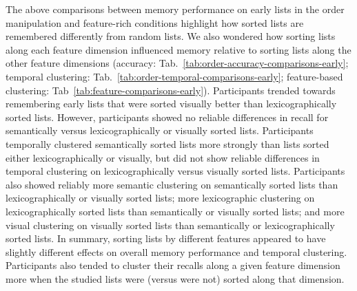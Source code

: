 \documentclass[11pt]{article}
\newcommand{\abbreviations}{S1}
\begin{document}
\begin{table}[tp]
\centering
\tiny

    
\caption{\textbf{Comparing temporal clustering on early lists in different
order manipulation conditions.} The independent samples $t$-tests reported in
the table were carried out across-participants, and reflect data aggregated
across all early lists from each participant. Abbreviations used in this table
are defined in Table~\abbreviations.}

\label{tab:order-temporal-comparisons-early}
\end{table}

\begin{table}[tp]
\centering
\tiny

    
\caption{\textbf{Comparing feature-based clustering on early lists in different
order manipulation conditions.} The independent samples $t$-tests reported in
the table were carried out across-participants, and reflect data aggregated
across all early lists from each participant. The feature used to compute
clustering is shown before the colon in each row, and the conditions being
compared are shown after the colon. Abbreviations used in this table are
defined in Table~\abbreviations.}

\label{tab:feature-comparisons-early}
\end{table}



The above comparisons between memory performance on early lists in the order
manipulation and feature-rich conditions highlight how sorted lists are
remembered differently from random lists. We also wondered how sorting lists
along each feature dimension influenced memory relative to sorting lists along
the other feature dimensions (accuracy:
Tab.~\ref{tab:order-accuracy-comparisons-early}; temporal clustering:
Tab.~\ref{tab:order-temporal-comparisons-early}; feature-based
clustering: Tab~\ref{tab:feature-comparisons-early}). Participants trended
towards remembering early lists that were sorted visually
better than lexicographically sorted lists. However, participants showed no
reliable differences in recall for semantically versus lexicographically or visually sorted lists.
Participants temporally clustered semantically sorted lists more strongly than
lists sorted either lexicographically or visually, but did not show reliable
differences in temporal clustering on lexicographically versus visually sorted
lists. Participants also showed reliably more semantic clustering on
semantically sorted lists than lexicographically or visually sorted lists; more
lexicographic clustering on lexicographically sorted lists than semantically or
visually sorted lists; and more visual clustering on visually sorted lists than
semantically or lexicographically sorted lists. In summary, sorting lists by
different features appeared to have slightly different effects on overall
memory performance and temporal clustering. Participants also tended to cluster
their recalls along a given feature dimension more when the studied lists were
(versus were not) sorted along that dimension.
\end{document}
